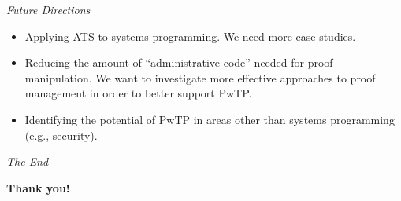 \documentclass[pdf]{prosper}
\begin{document}
\begin{slide}{\em Future Directions}
\begin{itemize}
\item Applying ATS to systems programming. We need more case studies.
\item
Reducing the amount of ``administrative code'' needed for proof
manipulation. We want to investigate more effective approaches to proof
management in order to better support PwTP.
\item
Identifying the potential of PwTP in areas other than systems programming
(e.g., security).
\end{itemize}
\end{slide}
\begin{slide}{\em The End}
\vspace{72pt}
\begin{center}
{\huge\bf Thank you!}
\end{center}
\end{slide}
\end{document}
